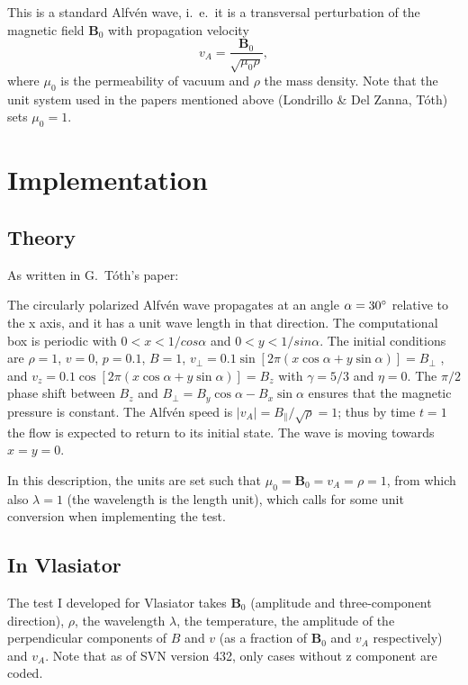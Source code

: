 \documentclass[a4paper,10pt]{scrartcl}
\begin{document}
This is a standard Alfvén wave, i.\ e.\ it is a transversal perturbation of the magnetic field $\mathbf{B}_0$ with propagation velocity
\begin{equation}
 v_A = \frac{\mathbf{B}_0}{\sqrt{\mu_0\rho}},
\end{equation}
where $\mu_0$ is the permeability of vacuum and $\rho$ the mass density. Note that the unit system used in the papers mentioned above (Londrillo \& Del Zanna, Tóth) sets $\mu_0=1$.


\section{Implementation}
\subsection{Theory}
As written in G.\ Tóth's paper:

The circularly polarized Alfvén wave propagates at an angle $\alpha = 30\degree$ relative to the x axis, and it has a unit wave length in that direction. The computational box is periodic with $0 < x < 1/cos \alpha$ and $0 < y < 1/sin \alpha$. The initial conditions are $\rho = 1$, $v = 0$,
$p = 0.1$, $B = 1$, $v_{\perp} = 0.1 \sin[2\pi(x \cos \alpha + y \sin \alpha)] = B_{\perp}$ , and $v_z = 0.1 \cos[2\pi(x \cos \alpha + y \sin \alpha)] = B_z$ with $\gamma = 5/3$ and $\eta = 0$. The $\pi/2$ phase shift between $B_z$ and $B_\perp = B_y \cos \alpha - B_x \sin \alpha$ ensures that the magnetic pressure is constant. The Alfvén speed is $|v_A| = B_\parallel / \sqrt{\rho} = 1$; thus by time $t = 1$ the flow is expected to return to its initial state. The wave is moving towards $x = y = 0$.

In this description, the units are set such that $\mu_0 = \mathbf{B}_0 = v_A = \rho = 1$, from which also $\lambda = 1$ (the wavelength is the length unit), which calls for some unit conversion when implementing the test.

\subsection{In Vlasiator}
The test I developed for Vlasiator takes $\mathbf{B}_0$ (amplitude and three-component direction), $\rho$, the wavelength $\lambda$, the temperature, the amplitude of the perpendicular components of $B$ and $v$ (as a fraction of $\mathbf{B}_0$ and $v_A$ respectively) and $v_A$. Note that as of SVN version 432, only cases without z component are coded.
\end{document}
